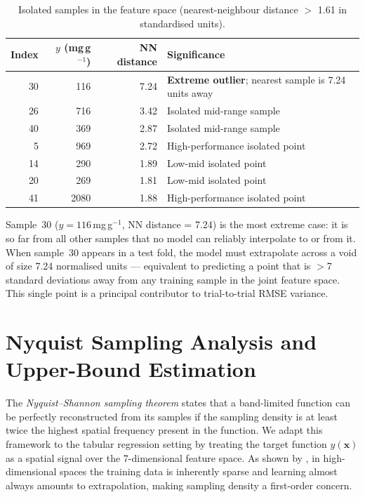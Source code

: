 \documentclass[12pt,a4paper]{article}
\begin{document}
\begin{table}[h]
\centering
\caption{Isolated samples in the feature space (nearest-neighbour distance
  $>$ 1.61 in standardised units).}
\label{tab:isolated}
\begin{tabular}{rrrp{7cm}}
\toprule
Index & $y$ (mg\,g$^{-1}$) & NN distance & Significance \\
\midrule
30  & 116  & 7.24 & \textbf{Extreme outlier}; nearest sample is 7.24 units away \\
26  & 716  & 3.42 & Isolated mid-range sample \\
40  & 369  & 2.87 & Isolated mid-range sample \\
5   & 969  & 2.72 & High-performance isolated point \\
14  & 290  & 1.89 & Low-mid isolated point \\
20  & 269  & 1.81 & Low-mid isolated point \\
41  & 2080 & 1.88 & High-performance isolated point \\
\bottomrule
\end{tabular}
\end{table}

Sample~30 ($y=116$\,mg\,g$^{-1}$, NN distance = 7.24) is the most extreme
case: it is so far from all other samples that no model can reliably
interpolate to or from it.  When sample~30 appears in a test fold, the
model must extrapolate across a void of size 7.24 normalised units —
equivalent to predicting a point that is $>$7 standard deviations away
from any training sample in the joint feature space.  This single point
is a principal contributor to trial-to-trial RMSE variance.

\section{Nyquist Sampling Analysis and Upper-Bound Estimation}
\label{sec:nyquist}

The \emph{Nyquist--Shannon sampling theorem} \citep{Nyquist1928, Shannon1949} states that a band-limited
function can be perfectly reconstructed from its samples if the sampling
density is at least twice the highest spatial frequency present in the
function.  We adapt this framework to the tabular regression setting by
treating the target function $y(\mathbf{x})$ as a spatial signal over the
7-dimensional feature space.  As shown by \citet{Balestriero2021}, in
high-dimensional spaces the training data is inherently sparse and
learning almost always amounts to extrapolation, making sampling density
a first-order concern.
\end{document}
